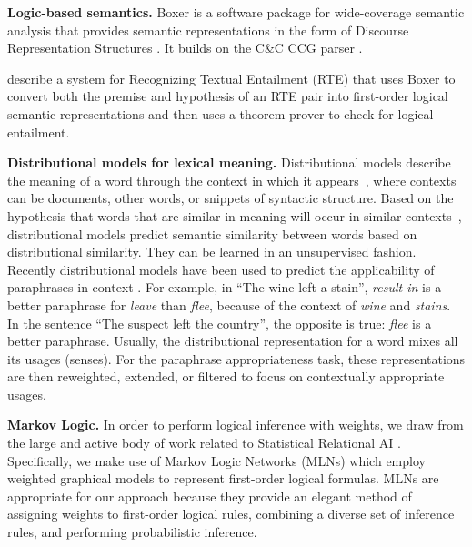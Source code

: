 \textbf{Logic-based semantics.}
Boxer \citep{bos:coling2004} is a software package for wide-coverage semantic
analysis that provides semantic representations in the form of Discourse
Representation Structures \citep{kamp:book93}. It builds on the C\&C CCG parser
\citep{clark:acl04}.

\citet{bos:emnlp2005} describe a system for Recognizing Textual Entailment
(RTE) that uses Boxer to convert both the premise and hypothesis of an RTE pair
into first-order logical semantic representations and then uses a theorem prover
to check for logical entailment. 


\noindent\textbf{Distributional models for lexical meaning.} Distributional
models describe the meaning of a word through the context in which it
appears~\citep{landauer97:solution,lund96:producing}, where contexts can be
documents, other words, or snippets of syntactic structure. Based on
the hypothesis that words that are similar in meaning will occur in
similar contexts~\citep{harris:wj1954,firth:slaj1957}, distributional
models predict semantic similarity between words based on
distributional similarity. They can be learned in an unsupervised fashion.
Recently distributional models have been used to predict the applicability of
paraphrases in context \citep{erk:emnlp2008,thater:acl2010,reisinger:naacl2010,dinu:emnlp2010,vandecruys:emnlp2011}.
For example, in ``The wine left a stain'', {\it result in} is a better
paraphrase for {\it leave} than {\it flee}, because of the context of {\it wine}
and {\it stains}.  In the sentence ``The suspect left the country'', the
opposite is true: {\it flee} is a better paraphrase. Usually, the distributional
representation for a word mixes all its usages (senses). For the paraphrase
appropriateness task, these representations are then reweighted, extended, or
filtered to focus on contextually appropriate usages.

\noindent\textbf{Markov Logic.} 
In order to perform logical inference with weights, we draw
from the large and active body of work related to Statistical Relational AI
\citep{getoor:book2007}.  Specifically, we make use of Markov Logic Networks
(MLNs) \citep{richardson:mlj06} which employ weighted graphical models to
represent first-order logical formulas. MLNs are appropriate for our approach
because they provide an elegant method of assigning weights to first-order
logical rules, combining a diverse set of inference rules, and performing
probabilistic inference.

